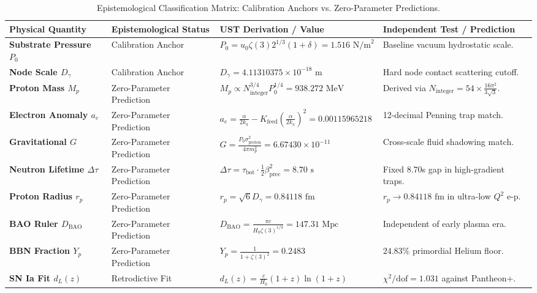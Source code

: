 \documentclass[11pt,a4paper]{article}
\begin{document}
	\begin{table}[H]
		\centering
		\caption{Epistemological Classification Matrix: Calibration Anchors vs. Zero-Parameter Predictions.}
		\label{tab:epistemology_matrix}
		\begin{tabular}{p{3.2cm}p{3.4cm}p{4.6cm}p{4.6cm}}
			\toprule
			\textbf{Physical Quantity} & \textbf{Epistemological Status} & \textbf{UST Derivation / Value} & \textbf{Independent Test / Prediction} \\
			\midrule
			\textbf{Substrate Pressure $P_0$} & Calibration Anchor & $P_0 = u_0 \zeta(3) 2^{1/3}(1+\delta) = 1.516\text{ N/m}^2$ & Baseline vacuum hydrostatic scale. \\
			\addlinespace
			\textbf{Node Scale $D_\gamma$} & Calibration Anchor & $D_\gamma = 4.11310375 \times 10^{-18}\text{ m}$ & Hard node contact scattering cutoff. \\
			\addlinespace
			\textbf{Proton Mass $M_p$} & Zero-Parameter Prediction & $M_p \propto N_{\text{integer}}^{3/4} P_0^{1/4} = 938.272\text{ MeV}$ & Derived via $N_{\text{integer}} = 54 \times \frac{16\pi^2}{3\sqrt{3}}$. \\
			\addlinespace
			\textbf{Electron Anomaly $a_e$} & Zero-Parameter Prediction & $a_e = \frac{\alpha}{2k_\pi} - K_{\text{feed}} (\frac{\alpha}{2k_\pi})^2 = 0.00115965218$ & 12-decimal Penning trap match. \\
			\addlinespace
			\textbf{Gravitational $G$} & Zero-Parameter Prediction & $G = \frac{P_0 \sigma_{\text{proton}}^2}{4\pi m_p^2} = 6.67430 \times 10^{-11}$ & Cross-scale fluid shadowing match. \\
			\addlinespace
			\textbf{Neutron Lifetime $\Delta\tau$} & Zero-Parameter Prediction & $\Delta\tau = \tau_{\text{bot}} \cdot \frac{1}{2}\beta_{\text{prec}}^2 = 8.70\text{ s}$ & Fixed 8.70s gap in high-gradient traps. \\
			\addlinespace
			\textbf{Proton Radius $r_p$} & Zero-Parameter Prediction & $r_p = \sqrt{6}D_\gamma = 0.84118\text{ fm}$ & $r_p \to 0.84118\text{ fm}$ in ultra-low $Q^2$ e-p. \\
			\addlinespace
			\textbf{BAO Ruler $D_{\text{BAO}}$} & Zero-Parameter Prediction & $D_{\text{BAO}} = \frac{\pi c}{H_0 \zeta(3)^{1/3}} = 147.31\text{ Mpc}$ & Independent of early plasma era. \\
			\addlinespace
			\textbf{BBN Fraction $Y_p$} & Zero-Parameter Prediction & $Y_p = \frac{1}{1+\zeta(3)^2} = 0.2483$ & $24.83\%$ primordial Helium floor. \\
			\addlinespace
			\textbf{SN Ia Fit $d_L(z)$} & Retrodictive Fit & $d_L(z) = \frac{c}{H_0}(1+z)\ln(1+z)$ & $\chi^2/\text{dof} = 1.031$ against Pantheon+. \\
			\bottomrule
		\end{tabular}
	\end{table}
	
\end{document}
